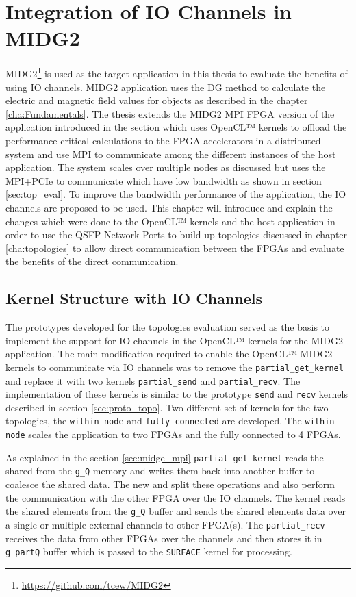 \chapter{Integration of IO Channels in MIDG2}
\label{cha:sys_arch}

MIDG2\footnote{\url{https://github.com/tcew/MIDG2}} is used as the target
application in this thesis to evaluate the benefits of using IO channels.
MIDG2 application uses the \ac{DG} method to calculate the electric and magnetic
field values for objects as described in the chapter \ref{cha:Fundamentals}.
The thesis extends the MIDG2 MPI FPGA version of the application introduced in the
section \label{sec:midge_mpi} which uses OpenCL™ kernels to
offload the performance critical calculations to the FPGA accelerators in a
distributed system and use MPI to communicate among the different instances of the
host application. The system scales over multiple nodes as discussed but
uses the MPI+PCIe to communicate which have low bandwidth as shown in section
\ref{sec:top_eval}. To improve the bandwidth performance of the application,
the IO channels are proposed to be used. This chapter will
introduce and explain the changes which were done to the OpenCL™ kernels and the
host application in order to use the QSFP Network Ports to build up topologies discussed
in chapter \ref{cha:topologies} to allow direct communication between the FPGAs
and evaluate the benefits of the direct communication.

\section{Kernel Structure with IO Channels}
\label{sec:struc_iochan}

The prototypes developed for the topologies evaluation served as the basis to implement
the support for IO channels in the OpenCL™ kernels for the MIDG2 application. The main
modification required to enable the OpenCL™ MIDG2 kernels to communicate via IO channels
was to remove the \texttt{partial\_get\_kernel} and replace it with two kernels
\texttt{partial\_send} and \texttt{partial\_recv}. The implementation of these kernels
is similar to the prototype \texttt{send} and \texttt{recv} kernels described in
section \ref{sec:proto_topo}. Two different set of kernels for the two topologies,
the \texttt{within node} and \texttt{fully connected} are developed. The \texttt{within node}
scales the application to two FPGAs and the fully connected to 4 FPGAs.

As explained in the section \ref{sec:midge_mpi} \texttt{partial\_get\_kernel} reads
the shared from the \texttt{g\_Q} memory and writes them back into another buffer
to coalesce the shared data. The new  and 
split these operations and also perform the communication with the
other FPGA over the IO channels. The  kernel reads the
shared elements from the \texttt{g\_Q} buffer and sends the shared elements data
over a single or multiple external channels to other FPGA(s).
The \texttt{partial\_recv} receives the data from other FPGAs over the channels and
then stores it in \texttt{g\_partQ} buffer which is passed to the \texttt{SURFACE}
kernel for processing.

